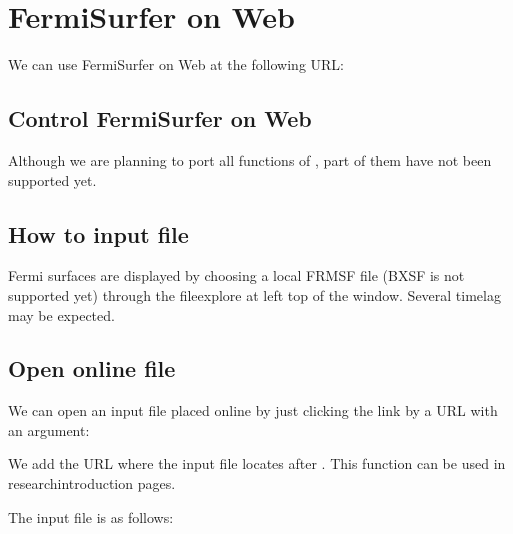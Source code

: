 \documentclass[letterpaper,10pt,pdftex,openany,english]{sphinxmanual}
\begin{document}
\sphinxstepscope


\chapter{FermiSurfer on Web}
\label{\detokenize{onweb:fermisurfer-on-web}}\label{\detokenize{onweb::doc}}
\sphinxAtStartPar
We can use FermiSurfer on Web at the following URL:


\section{Control FermiSurfer on Web}
\label{\detokenize{onweb:control-fermisurfer-on-web}}
\sphinxAtStartPar
Although we are planning to port all functions of {\hyperref[\detokenize{ops:ops}]{}},
part of them have not been supported yet.


\section{How to input file}
\label{\detokenize{onweb:how-to-input-file}}
\sphinxAtStartPar
Fermi surfaces are displayed by choosing a local FRMSF file (BXSF is not supported yet)
through the file\sphinxhyphen{}explore at left top of the window.
Several time\sphinxhyphen{}lag may be expected.


\section{Open online file}
\label{\detokenize{onweb:open-online-file}}
\sphinxAtStartPar
We can open an input file placed online by just clicking the link by a URL with an argument:

\sphinxAtStartPar
{}

\sphinxAtStartPar
We add the URL where the input file locates after .
This function can be used in research\sphinxhyphen{}introduction pages.

\sphinxAtStartPar
The input file  is as follows:

\begin{sphinxVerbatim}[commandchars=\\\{\}]
\end{sphinxVerbatim}
\end{document}

